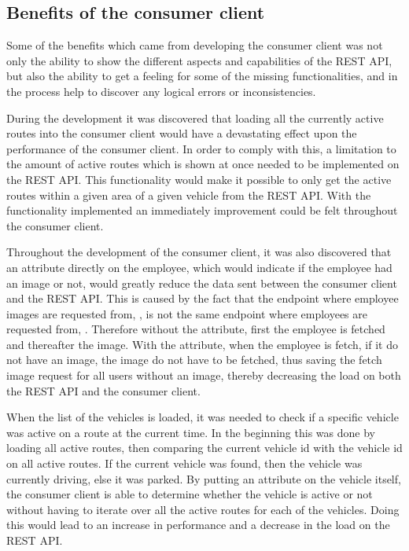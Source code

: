 \subsection{Benefits of the consumer client}\label{ssec:benefits_consumer_client}
Some of the benefits which came from developing the consumer client was not only the ability to show the different aspects and capabilities of the REST API, but also the ability to get a feeling for some of the missing functionalities, and in the process help to discover any logical errors or inconsistencies.

\bigskip
During the development it was discovered that loading all the currently active routes into the consumer client would have a devastating effect upon the performance of the consumer client.
In order to comply with this, a limitation to the amount of active routes which is shown at once needed to be implemented on the REST API.
This functionality would make it possible to only get the active routes within a given area of a given vehicle from the REST API.
With the functionality implemented an immediately improvement could be felt throughout the consumer client.

\bigskip
Throughout the development of the consumer client, it was also discovered that an attribute directly on the employee, which would indicate if the employee had an image or not, would greatly reduce the data sent between the consumer client and the REST API.
This is caused by the fact that the endpoint where employee images are requested from, , is not the same endpoint where employees are requested from, .
Therefore without the attribute, first the employee is fetched and thereafter the image.
With the attribute, when the employee is fetch, if it do not have an image, the image do not have to be fetched, thus saving the fetch image request for all users without an image, thereby decreasing the load on both the REST API and the consumer client.

\bigskip
When the list of the vehicles is loaded, it was needed to check if a specific vehicle was active on a route at the current time.
In the beginning this was done by loading all active routes, then comparing the current vehicle id with the vehicle id on all active routes.
If the current vehicle was found, then the vehicle was currently driving, else it was parked.
By putting an attribute on the vehicle itself, the consumer client is able to determine whether the vehicle is active or not without having to iterate over all the active routes for each of the vehicles.
Doing this would lead to an increase in performance and a decrease in the load on the REST API.

